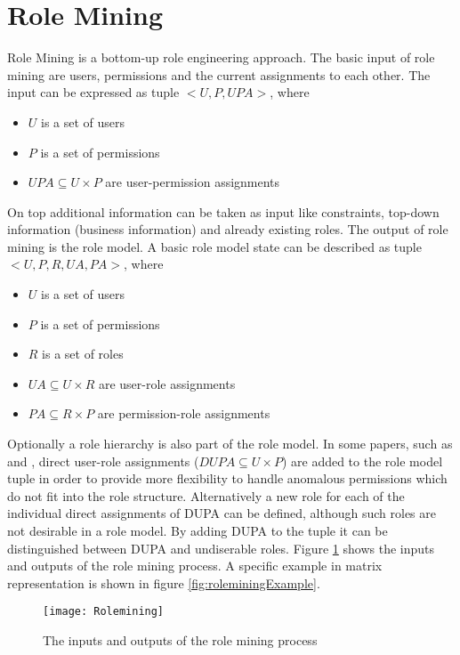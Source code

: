    \section{Role Mining}
    Role Mining is a bottom-up role engineering approach. The basic input of role mining are users, permissions and the current assignments to each other. The input can be expressed as tuple $<U,P,UPA>$, where
    \begin{itemize}[noitemsep,topsep=0pt,parsep=0pt,partopsep=0pt]
        \item \textbf{$U$} is a set of users
        \item \textbf{$P$} is a set of permissions
        \item \textbf{$UPA \subseteq U \times P$} are user-permission assignments
    \end{itemize}
    On top additional information can be taken as input like constraints, top-down information (business information) and already existing roles. The output of role mining is the role model. A basic role model state can be described as tuple $<U,P,R,UA,PA>$, where
    \begin{itemize}[noitemsep,topsep=0pt,parsep=0pt,partopsep=0pt]
        \item \textbf{$U$} is a set of users
        \item \textbf{$P$} is a set of permissions
        \item \textbf{$R$} is a set of roles
        \item \textbf{$UA \subseteq U \times R$} are user-role assignments
        \item \textbf{$PA \subseteq R \times P$} are permission-role assignments
    \end{itemize}
    Optionally a role hierarchy is also part of the role model. In some papers, such as \cite{Molloy} and \cite{DuChang}, direct user-role assignments ($DUPA \subseteq U \times P$) are added to the role model tuple in order to provide more flexibility to handle anomalous permissions which do not fit into the role structure. Alternatively a new role for each of the individual direct assignments of DUPA can be defined, although such roles are not desirable in a role model. By adding DUPA to the tuple it can be distinguished between DUPA and undiserable roles. Figure \ref{fig:rolemining} shows the inputs and outputs of the role mining process.  A specific example in matrix representation is shown in figure \ref{fig:roleminingExample}.
    
    \begin{figure}[H]
        \centering
        \texttt{[image: Rolemining]}
        \caption{The inputs and outputs of the role mining process}
        \label{fig:rolemining}
    \end{figure}
    
